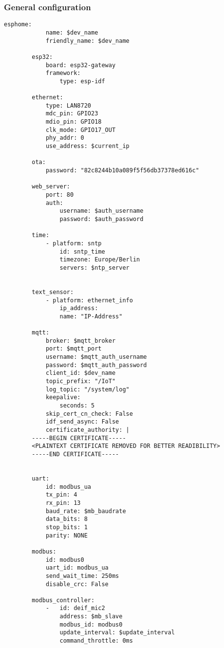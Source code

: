 	\subsubsection{General configuration}
		\begin{lstlisting}[tabsize=2, gobble=4, caption={Basic esphome configuration}, label=lst:esphome-basic]
		esphome:
			name: $dev_name
			friendly_name: $dev_name
		
		esp32:
			board: esp32-gateway
			framework:
				type: esp-idf
		
		ethernet:
			type: LAN8720
			mdc_pin: GPIO23
			mdio_pin: GPIO18
			clk_mode: GPIO17_OUT
			phy_addr: 0
			use_address: $current_ip 
	
		ota:
			password: "82c8244b10a089f5f56db37378ed616c"
		
		web_server:
			port: 80
			auth:
				username: $auth_username
				password: $auth_password

		time:
			- platform: sntp
				id: sntp_time
				timezone: Europe/Berlin
				servers: $ntp_server
		

		text_sensor:
			- platform: ethernet_info
				ip_address:
				name: "IP-Address"
	
		mqtt:
			broker: $mqtt_broker
			port: $mqtt_port
			username: $mqtt_auth_username
			password: $mqtt_auth_password
			client_id: $dev_name
			topic_prefix: "/IoT"
			log_topic: "/system/log"
			keepalive:
				seconds: 5
			skip_cert_cn_check: False
			idf_send_async: False
			certificate_authority: |
		-----BEGIN CERTIFICATE-----
		<PLAINTEXT CERTIFICATE REMOVED FOR BETTER READIBILITY>
		-----END CERTIFICATE-----
		
		
		uart:
			id: modbus_ua
			tx_pin: 4
			rx_pin: 13
			baud_rate: $mb_baudrate
			data_bits: 8
			stop_bits: 1
			parity: NONE
		
		modbus:
			id: modbus0
			uart_id: modbus_ua
			send_wait_time: 250ms
			disable_crc: False
		
		modbus_controller:
			-	id: deif_mic2
				address: $mb_slave
				modbus_id: modbus0
				update_interval: $update_interval
				command_throttle: 0ms
		\end{lstlisting}